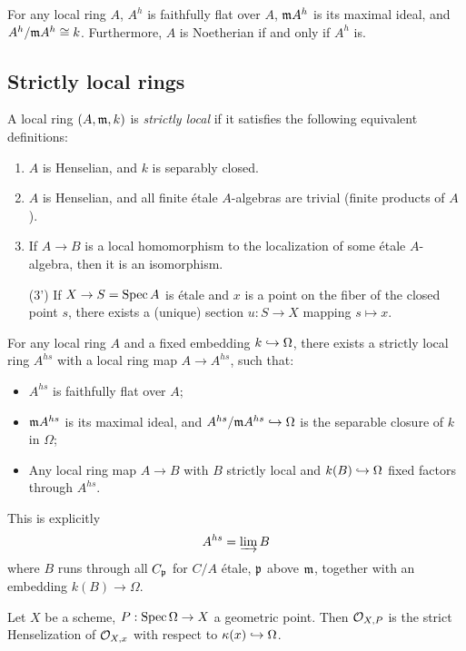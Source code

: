 \documentclass[11pt]{amsart}
\begin{document}
\begin{prop}
    For any local ring $A$, $A^h$ is faithfully flat over $A$, $\mathfrak{m} A^h$ is its maximal ideal, and $A^h/\mathfrak{m} A^h \cong k$. Furthermore, $A$ is Noetherian if and only if $A^h$ is.
\end{prop}


\subsection{Strictly local rings}

\begin{defn}
    A local ring $(A,\mathfrak{m}, k)$ is \emph{strictly local} if it satisfies the following equivalent definitions:
    \begin{enumerate}
        \item $A$ is Henselian, and $k$ is separably closed.
        \item $A$ is Henselian, and all finite \'etale $A$-algebras are trivial (finite products of $A$).
        \item If $A\to B$ is a local homomorphism to the localization of some \'etale $A$-algebra, then it is an isomorphism.
        \item[(3')] If $X\to S = \operatorname{Spec} A$ is \'etale and $x$ is a point on the fiber of the closed point $s$, there exists a (unique) section $u:S\to X$ mapping $s\mapsto x$.
    \end{enumerate}
\end{defn}

\begin{defn}
    For any local ring $A$ and a fixed embedding $k\hookrightarrow \Omega$, there exists a strictly local ring $A^{hs}$ with a local ring map $A\to A^{hs}$, such that:
    \begin{itemize}
        \item $A^{hs}$ is faithfully flat over $A$;
        \item $\mathfrak{m} A^{hs}$ is its maximal ideal, and $A^{hs}/\mathfrak{m} A^{hs} \hookrightarrow \Omega$ is the separable closure of $k$ in $\Omega$;
        \item Any local ring map $A\to B$ with $B$ strictly local and $k(B)\hookrightarrow\Omega$ fixed factors through $A^{hs}$.
    \end{itemize}
    This is explicitly
    \[A^{hs} = \varinjlim B\]
    where $B$ runs through all $C_{\mathfrak{p}}$ for $C/A$ \'etale, $\mathfrak{p}$ above $\mathfrak{m}$, together with an embedding $k(B)\to \Omega$.
\end{defn}


\begin{exm}
    Let $X$ be a scheme, $P:\operatorname{Spec} \Omega\to X$ a geometric point. Then $\mathcal{O}_{X,P}$ is the strict Henselization of $\mathcal{O}_{X,x}$ with respect to $\kappa(x)\hookrightarrow\Omega$.
\end{exm}
\end{document}
